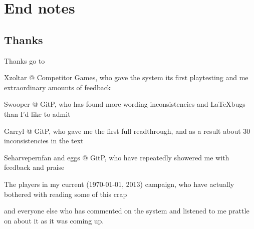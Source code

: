 \section{End notes}
\subsection{Thanks}
Thanks go to 
\begin{list}{}{\leftmargin=1em}
 \item Xzoltar @ Competitor Games, who gave the system its first playtesting and me extraordinary amounts of feedback
 \item Swooper @ GitP, who has found more wording inconsistencies and \LaTeX bugs than I'd like to admit
 \item Garryl @ GitP, who gave me the first full readthrough, and as a result about 30 inconsistencies in the text
 \item Seharvepernfan and eggs @ GitP, who have repeatedly showered me with feedback and praise
 \item The players in my current (\today, 2013) campaign, who have actually bothered with reading some of this crap
 \item and everyone else who has commented on the system and listened to me prattle on about it as it was coming up.
\end{list}
